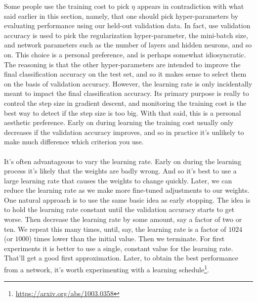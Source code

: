 Some people use the training cost to pick $\eta$ appears in contradiction with what said earlier in this section, namely, that one should pick hyper-parameters by evaluating performance using our held-out validation data. In fact, use validation accuracy is used to pick the regularization hyper-parameter, the mini-batch size, and network parameters such as the number of layers and hidden neurons, and so on.  This choice is a personal preference, and is perhaps somewhat idiosyncratic. The reasoning is that the other hyper-parameters are intended to improve the final classification accuracy on the test set, and so it makes sense to select them on the basis of validation accuracy. However, the learning rate is only incidentally meant to impact the final classification accuracy. Its primary purpose is really to control the step size in gradient descent, and monitoring the training cost is the best way to detect if the step size is too big. With that said, this is a personal aesthetic preference. Early on during learning the training cost usually only decreases if the validation accuracy improves, and so in practice it's unlikely to make much difference which criterion you use.

\paragraph{} It's often advantageous to vary the learning rate. Early on during the learning process it's likely that the weights are badly wrong. And so it's best to use a large learning rate that causes the weights to change quickly. Later, we can reduce the learning rate as we make more fine-tuned adjustments to our weights.  One natural approach is to use the same basic idea as early stopping. The idea is to hold the learning rate constant until the validation accuracy starts to get worse. Then decrease the learning rate by some amount, say a factor of two or ten. We repeat this many times, until, say, the learning rate is a factor of $1024$ (or $1000$) times lower than the initial value. Then we terminate.  For first experiments it is better to use a single, constant value for the learning rate. That'll get a good first approximation. Later, to obtain the best performance from a network, it's worth experimenting with a learning schedule\footnote{\url{https://arxiv.org/abs/1003.0358}}.

